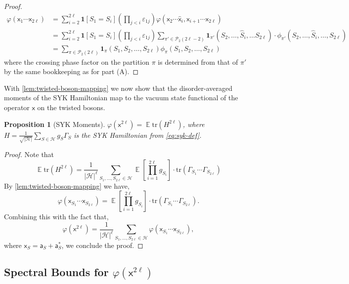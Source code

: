 \documentclass
[11pt,letterpaper]
{article}
\renewcommand{\hat}[1]{\widehat{#1}}
\newtheorem{proposition}[theorem]{Proposition}
\theoremstyle{definition}
\newcommand{\sfa}{\mathsf a}
\newcommand{\sfx}{\mathsf x}
\newcommand{\eps}{\varepsilon}
\newcommand{\1}{\mathbf{1}}
\newcommand{\tr}{\mathrm{tr}}
\newcommand{\cH}{\mathcal H}
\DeclareMathOperator*{\E}{\mathbb{E}}
\newcommand{\cP}{\mathcal{P}}
\begin{document}
\begin{proof}
     \begin{align*}
         \varphi(\sfx_{1}\cdots \sfx_{{2\ell}}) &= \sum_{i=2}^{2\ell} \1[S_1 = S_i] \left(\prod_{j<i}\eps_{1j}\right)\varphi(\sfx_{2}\cdots \hat{\sfx}_{i}, \sfx_{i+1}\cdots \sfx_{{2\ell}}) \\ 
         &= \sum_{i=2}^{2\ell} \1[S_1 = S_i] \left(\prod_{j<i}\eps_{1j}\right) \sum_{\pi'\in \cP_2(2\ell-2)}\1_{\pi'}(S_2,\ldots,\hat{S}_i,\ldots S_{2\ell})\cdot \phi_{\pi'}(S_2,\ldots,\hat{S}_i,\ldots, S_{2\ell}) \\ 
         &=\sum_{\pi \in \cP_2(2\ell)}\1_\pi(S_1,S_2,\dots,S_{2\ell})\phi_\pi(S_1,S_2,\dots,S_{2\ell})
     \end{align*}     
     where the crossing phase factor on the partition $\pi$ is determined from that of $\pi'$ by the same bookkeeping as for part (A). 
\end{proof}
With \cref{lem:twisted-boson-mapping} we now show that the disorder-averaged moments of the SYK Hamiltonian map to the vacuum state functional of the operator $\sfx$ on the twisted bosons.
\begin{proposition}[SYK Moments]\label{prop:varphi-trace-re}
    $\varphi(\sfx^{2\ell}) = \E\tr(H^{2\ell})$, where $H = \frac{1}{\sqrt{|\cH|}}\sum_{S\in\cH}g_S\Gamma_S$ is the SYK Hamiltonian from \cref{eq:syk-def}.
\end{proposition}

\begin{proof}
       Note that 
    \[\E\tr(H^{2\ell}) = \frac{1}{|\cH|^\ell}\sum_{S_1, \ldots, S_{2\ell}\in\cH}\E\left[\prod_{i = 1}^{2\ell}g_{S_i}\right]\cdot\tr\left(\Gamma_{S_1}\cdots\Gamma_{S_{2\ell}}\right)\] 
    By \cref{lem:twisted-boson-mapping} we have,
    \[\varphi(\sfx_{S_1}\cdots \sfx_{S_{2\ell}}) = \E\left[\prod_{i = 1}^{2\ell}g_{S_i}\right]\cdot\tr\left(\Gamma_{S_1}\cdots\Gamma_{S_{2\ell}}\right).\]
    Combining this with the fact that,
    \[\varphi(\sfx^{2\ell}) = \frac{1}{|\cH|^\ell}\sum_{S_1, \ldots, S_{2\ell}\in\cH}\varphi(\sfx_{S_1}\cdots \sfx_{S_{2\ell}}),\]
    where $\sfx_S = \sfa_S + \sfa_S^*$, we conclude the proof.
\end{proof}
\subsection{Spectral Bounds for $\varphi(\sfx^{2\ell})$}
\end{document}
